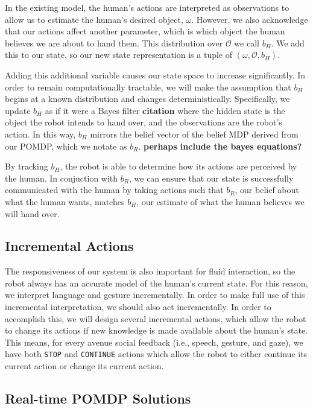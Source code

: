 \documentclass{article}
\begin{document}
In the existing model, the human's actions are interpreted as observations to allow us to estimate the human's desired object, $\omega$. However, we also acknowledge that our actions affect another parameter, which is which object the human believes we are about to hand them. This distribution over $\mathcal{O}$ we call $b_H$. We add this to our state, so our new state representation is a tuple of $(\omega, \mathcal{O}, b_H)$. 

Adding this additional variable causes our state space to increase significantly. In order to remain computationally tractable, we will make the assumption that $b_H$ begins at a known distribution and changes deterministically. Specifically, we update $b_H$ as if it were a Bayes filter \textbf{citation} where the hidden state is the object the robot intends to hand over, and the observations are the robot's action. In this way, $b_H$ mirrors the belief vector of the belief MDP derived from our POMDP, which we notate as $b_R$. 
\textbf{perhaps include the bayes equations?}

By tracking $b_H$, the robot is able to determine how its actions are perceived by the human. In conjuction with $b_R$, we can ensure that our state is successfully communicated with the human by taking actions such that $b_R$, our belief about what the human wants, matches $b_H$, our estimate of what the human believes we will hand over. 


\subsection{Incremental Actions}

The responsiveness of our system is also important for fluid interaction, so the robot always has an accurate model of the human's current state. For this reason, we interpret language and gesture incrementally. In order to make full use of this incremental interpretation, we should also act incrementally. In order to accomplish this, we will design several incremental actions, which allow the robot to change its actions if new knowledge is made available about the human's state. This means, for every avenue social feedback (i.e., speech, gesture, and gaze), we have both \texttt{STOP} and \texttt{CONTINUE} actions which allow the robot to either continue its current action or change its current action. 

\subsection{Real-time POMDP Solutions}
\end{document}
